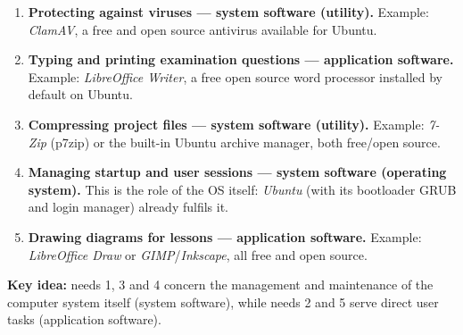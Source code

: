 \documentclass[11pt]{article}
\begin{document}
\begin{corrige}
\begin{enumerate}
\item \textbf{Protecting against viruses — system software (utility).} Example: \emph{ClamAV}, a free and open source antivirus available for Ubuntu.
\item \textbf{Typing and printing examination questions — application software.} Example: \emph{LibreOffice Writer}, a free open source word processor installed by default on Ubuntu.
\item \textbf{Compressing project files — system software (utility).} Example: \emph{7-Zip} (p7zip) or the built-in Ubuntu archive manager, both free/open source.
\item \textbf{Managing startup and user sessions — system software (operating system).} This is the role of the OS itself: \emph{Ubuntu} (with its bootloader GRUB and login manager) already fulfils it.
\item \textbf{Drawing diagrams for lessons — application software.} Example: \emph{LibreOffice Draw} or \emph{GIMP}/\emph{Inkscape}, all free and open source.
\end{enumerate}
\textbf{Key idea:} needs 1, 3 and 4 concern the management and maintenance of the computer system itself (system software), while needs 2 and 5 serve direct user tasks (application software).
\end{corrige}
\end{document}
